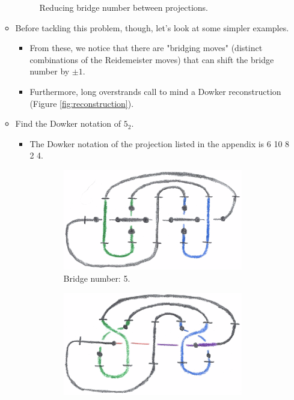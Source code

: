\documentclass[titlepage]{article}
\numberwithin{figure}{section}
\numberwithin{table}{section}
\numberwithin{equation}{section}
\begin{document}
\begin{itemize}
\begin{itemize}
\begin{figure}[h!]
            \caption{Reducing bridge number between projections.}
            \label{fig:ex3-11}
        \end{figure}
        \item Before tackling this problem, though, let's look at some simpler examples.
        \begin{itemize}
            \item From these, we notice that there are "bridging moves" (distinct combinations of the Reidemeister moves) that can shift the bridge number by $\pm 1$.
            \item Furthermore, long overstrands call to mind a Dowker reconstruction (Figure \ref{fig:reconstruction}).
        \end{itemize}
        \item Find the Dowker notation of $5_2$.
        \begin{itemize}
            \item The Dowker notation of the projection listed in the appendix is 6 10 8 2 4.
        \end{itemize}
        \begin{figure}[h!]
            \centering
            \begin{subfigure}[b]{0.3\linewidth}
                \centering
                \includegraphics[width=0.8\linewidth]{Blender/ex3-11-2a.png}
                \caption{Bridge number: 5.}
                \label{fig:ex3-11-2a}
            \end{subfigure}
            \begin{subfigure}[b]{0.3\linewidth}
                \centering
                \includegraphics[width=0.8\linewidth]{Blender/ex3-11-2b.png}

\end{subfigure}
\end{figure}
\end{itemize}
\end{itemize}
\end{document}
